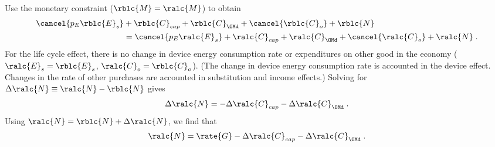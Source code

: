 \begin{landscape}
{Use the monetary constraint ($\rblc{M} = \ralc{M}$) to obtain
%
\begin{align} \label{M_dot_bal_lc}
  \cancel{p_E \rblc{E}_s} &+ \rblc{C}_{cap} + \rblc{C}_{\OMd} + \cancel{\rblc{C}_o} + \rblc{N} \nonumber \\
                          &= \cancel{p_E \ralc{E}_s} + \ralc{C}_{cap} + \ralc{C}_{\OMd} + \cancel{\ralc{C}_o}  + \ralc{N} \; .
\end{align}
%
For the life cycle effect, 
there is no change in device energy consumption rate or expenditures on other good in the economy 
($\ralc{E}_s = \rblc{E}_s$, $\ralc{C}_o = \rblc{C}_o$).
(The change in device energy consumption rate is accounted in the device effect.
Changes in the rate of other purchases are accounted in substitution and income effects.)
Solving for $\Delta \ralc{N} \equiv \ralc{N} - \rblc{N}$ gives
%
\begin{equation}
  \Delta \ralc{N} = - \Delta \ralc{C}_{cap} - \Delta \ralc{C}_{\OMd} \; .
\end{equation}
%
Using $\ralc{N} = \rblc{N} + \Delta \ralc{N}$, we find that
%
\begin{equation}
  \ralc{N} = \rate{G} - \Delta \ralc{C}_{cap} - \Delta \ralc{C}_{\OMd} \; .
\end{equation}
%
}

\end{landscape}
